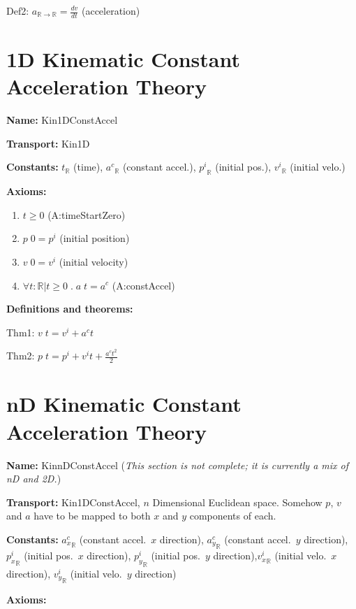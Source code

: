 \documentclass{article}
\begin{document}
Def2: $a_{\mathbb{R} \rightarrow \mathbb{R}} = \frac{dv}{dt}$ (acceleration)

\section{1D Kinematic Constant Acceleration Theory}

\noindent \textbf{Name:} Kin1DConstAccel

\noindent \textbf{Transport:} Kin1D

\noindent \textbf{Constants:} $t_{\mathbb{R}}$ (time), ${a^c}_{\mathbb{R}}$
(constant accel.), ${p^i}_{\mathbb{R}}$ (initial pos.), ${v^i}_{\mathbb{R}}$ (initial velo.)

\noindent \textbf{Axioms:}

\begin{enumerate}
    \item $t \geq 0$ (A:timeStartZero)
    \item $p \; 0 = p^i$ (initial position)
    \item $v \; 0 = v^i$ (initial velocity)
    \item $\forall t: \mathbb{R} | t \geq 0 \; . \; a \; t = a^c$ (A:constAccel)
\end{enumerate}

\noindent \textbf{Definitions and theorems:}

Thm1: $v \; t = v^i + a^c t$

Thm2: $p \; t = p^i + v^i t + \frac{a^c t^2}{2}$


\section{nD Kinematic Constant Acceleration Theory}

\noindent \textbf{Name:} KinnDConstAccel (\textit{This section is not complete;
it is currently a mix of nD and 2D.})

\noindent \textbf{Transport:} Kin1DConstAccel, $n$ Dimensional Euclidean space.  Somehow $p$, $v$ and $a$
have to be mapped to both $x$ and $y$ components of each.

\noindent \textbf{Constants:} ${a_x^c}_{\mathbb{R}}$ (constant accel.\ $x$
direction), ${a_y^c}_{\mathbb{R}}$ (constant accel.\ $y$ direction),
${p_x^i}_{\mathbb{R}}$ (initial pos.\ $x$ direction), ${p_y^i}_{\mathbb{R}}$
(initial pos.\ $y$ direction),${v_x^i}_{\mathbb{R}}$ (initial velo.\ $x$
direction), ${v_y^i}_{\mathbb{R}}$ (initial velo.\ $y$ direction) 

\noindent \textbf{Axioms:}
\end{document}
